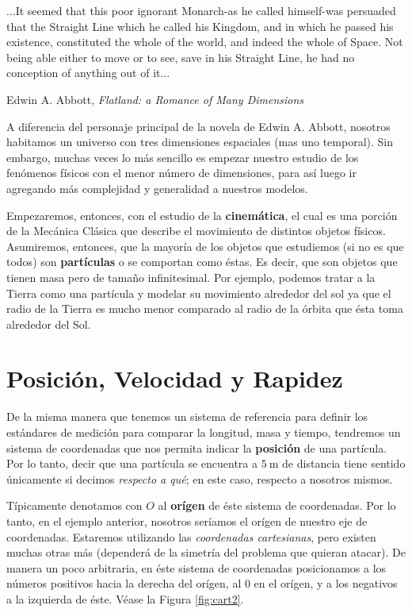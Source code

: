 %

\epigraph{...It seemed that this poor ignorant Monarch-as he called himself-was persuaded that the Straight Line which he called his Kingdom, and in which he passed his existence, constituted the whole of the world, and indeed the whole of Space. Not being able either to move or to see, save in his Straight Line, he had no conception of anything out of it...}{Edwin A. Abbott, \emph{Flatland: a Romance of Many Dimensions}}

A diferencia del personaje principal de la novela de Edwin A. Abbott, nosotros habitamos un universo con tres dimensiones espaciales (mas uno temporal). Sin embargo, muchas veces lo m\'as sencillo es empezar nuestro estudio de los fen\'omenos f\'isicos con el menor n\'umero de dimensiones, para as\'i luego ir agregando m\'as complejidad y generalidad a nuestros modelos.

Empezaremos, entonces, con el estudio de la \textbf{cinem\'atica}, el cual es una porci\'on de la Mec\'anica Cl\'asica que describe el movimiento de distintos objetos f\'isicos. Asumiremos, entonces, que la mayor\'ia de los objetos que estudiemos (si no es que todos) son \textbf{part\'iculas} o se comportan como \'estas. Es decir, que son objetos que tienen masa pero de tama\~no infinitesimal. Por ejemplo, podemos tratar a la Tierra como una part\'icula y modelar su movimiento alrededor del sol ya que el radio de la Tierra es mucho menor comparado al radio de la \'orbita que \'esta toma alrededor del Sol.

\section{Posici\'on, Velocidad y Rapidez}\label{sec:posvelrap2}

De la misma manera que tenemos un sistema de referencia para definir los est\'andares de medici\'on para comparar la longitud, masa y tiempo, tendremos un sistema de coordenadas que nos permita indicar la \textbf{posici\'on} de una part\'icula. Por lo tanto, decir que una part\'icula se encuentra a $\SI{5}{\meter}$ de distancia tiene sentido \'unicamente si decimos \emph{respecto a qu\'e}; en este caso, respecto a nosotros mismos.

T\'ipicamente denotamos con $O$ al \textbf{or\'igen} de \'este sistema de coordenadas. Por lo tanto, en el ejemplo anterior, nosotros ser\'iamos el or\'igen de nuestro eje de coordenadas. Estaremos utilizando las \emph{coordenadas cartesianas}, pero existen muchas otras m\'as (depender\'a de la simetr\'ia del problema que quieran atacar). De manera un poco arbitraria, en \'este sistema de coordenadas posicionamos a los n\'umeros positivos hacia la derecha del or\'igen, al 0 en el or\'igen, y a los negativos a la izquierda de \'este. V\'ease la Figura \ref{fig:cart2}.

